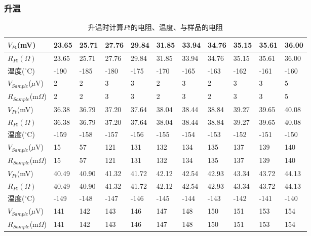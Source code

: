 \documentclass[UTF8]{ctexart}
\begin{document}
    \subsubsection{升温}

    \begin{table}[H]
        \centering
        \begin{tabular}{|l|l|l|l|l|l|l|l|l|l|l|}
        \hline
            $V_{Pt}$(mV) & 23.65 & 25.71 & 27.76 & 29.84 & 31.85 & 33.94 & 34.76 & 35.15 & 35.61 & 36.00 \\ \hline
            $R_{Pt}(\Omega)$ & 23.65 & 25.71 & 27.76 & 29.84 & 31.85 & 33.94 & 34.76 & 35.15 & 35.61 & 36.00 \\ \hline
            温度($^{\circ}$C) & -190 & -185 & -180 & -175 & -170 & -165 & -163 & -162 & -161 & -160 \\ \hline
            $V_{Sample}$($\mu$V) & 2 & 2 & 3 & 3 & 2 & 3 & 2 & 3 & 3 & 5 \\ \hline
            $R_{Sample}$(m$\Omega$) & 2 & 2 & 3 & 3 & 2 & 3 & 2 & 3 & 3 & 5 \\ \hline
            \hline
            $V_{Pt}$(mV) & 36.38 & 36.79 & 37.20 & 37.64 & 38.04 & 38.44 & 38.84 & 39.27 & 39.65 & 40.08 \\ \hline
            $R_{Pt}(\Omega)$ & 36.38 & 36.79 & 37.20 & 37.64 & 38.04 & 38.44 & 38.84 & 39.27 & 39.65 & 40.08 \\ \hline
            温度($^{\circ}$C) & -159 & -158 & -157 & -156 & -155 & -154 & -153 & -152 & -151 & -150 \\ \hline
            $V_{Sample}$($\mu$V) & 15 & 57 & 121 & 131 & 132 & 134 & 135 & 137 & 139 & 140 \\ \hline
            $R_{Sample}$(m$\Omega$) & 15 & 57 & 121 & 131 & 132 & 134 & 135 & 137 & 139 & 140 \\ \hline
            \hline
            $V_{Pt}$(mV) & 40.49 & 40.90 & 41.32 & 41.72 & 42.12 & 42.54 & 42.93 & 43.34 & 43.72 & 44.13 \\ \hline
            $R_{Pt}(\Omega)$ & 40.49 & 40.90 & 41.32 & 41.72 & 42.12 & 42.54 & 42.93 & 43.34 & 43.72 & 44.13 \\ \hline
            温度($^{\circ}$C) & -149 & -148 & -147 & -146 & -145 & -144 & -143 & -142 & -141 & -140 \\ \hline
            $V_{Sample}$($\mu$V) & 141 & 142 & 143 & 146 & 147 & 148 & 150 & 151 & 153 & 154 \\ \hline
            $R_{Sample}$(m$\Omega$) & 141 & 142 & 143 & 146 & 147 & 148 & 150 & 151 & 153 & 154 \\ \hline
       \end{tabular}
        \caption{升温时计算$Pt$的电阻、温度、与样品的电阻} %
        \label{升温计算表格} %
    \end{table}
\end{document}
